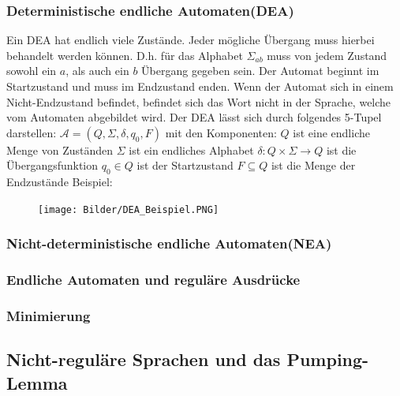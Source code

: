 \documentclass[12pt,a4paper]{article}
\begin{document}
\subsubsection{Deterministische endliche Automaten(DEA)}
Ein DEA hat endlich viele Zustände. Jeder mögliche Übergang muss hierbei behandelt werden können. D.h. für das Alphabet $\varSigma_{ab}$ muss von jedem Zustand sowohl ein $a$, als auch ein $b$ Übergang gegeben sein. Der Automat beginnt im Startzustand und muss im Endzustand enden. Wenn der Automat sich in einem Nicht-Endzustand befindet, befindet sich das Wort nicht in der Sprache, welche vom Automaten abgebildet wird.\newpage
\noindent Der DEA lässt sich durch folgendes 5-Tupel darstellen:\newline
$\mathcal{A} = (Q, \varSigma, \delta, q_0, F)$ mit den Komponenten:\newline
$Q$ ist eine endliche Menge von Zuständen\newline
$\varSigma$ ist ein endliches Alphabet\newline
$\delta: Q \times \varSigma \rightarrow Q$ ist die Übergangsfunktion\newline
$q_0 \in Q$ ist der Startzustand\newline
$F \subseteq Q$ ist die Menge der Endzustände\newline
\newline
Beispiel:\newline
\begin{center}
	\begin{figure}[!h]
		\texttt{[image: Bilder/DEA\_Beispiel.PNG]}
	\end{figure}
\end{center}

\subsubsection{Nicht-deterministische endliche Automaten(NEA)}

\subsubsection{Endliche Automaten und reguläre Ausdrücke}

\subsubsection{Minimierung}

\subsection{Nicht-reguläre Sprachen und das Pumping-Lemma}
\end{document}
